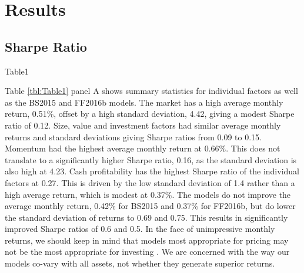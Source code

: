 
\section{Results} \label{sec:results}

\subsection{Sharpe Ratio}

{Table1}

Table \ref{tbl:Table1} panel A shows summary statistics for individual factors as well as the 
BS2015 and FF2016b models.
The market has a high average monthly return, 0.51\%, offset by a high standard deviation, 
4.42, giving a modest Sharpe ratio of 0.12.
Size, value and investment factors had similar average monthly returns and standard deviations 
giving Sharpe ratios from 0.09 to 0.15.
Momentum had the highest average monthly return at 0.66\%.
This does not translate to a significantly higher Sharpe ratio, 0.16, as the standard 
deviation is also high at 4.23.
Cash profitability has the highest Sharpe ratio of the individual factors at 0.27.
This is driven by the low standard deviation of 1.4 rather than a high average return, which 
is modest at 0.37\%.
The models do not improve the average monthly return, 0.42\% for BS2015 and 0.37\% for 
FF2016b, but do lower the standard deviation of returns to 0.69 and 0.75.
This results in significantly improved Sharpe ratios of 0.6 and 0.5.
In the face of unimpressive monthly returns, we should keep in mind that models most 
appropriate for pricing may not be the most appropriate for investing 
\parencite{pastor2000comparing}.
We are concerned with the way our models co-vary with all assets, not whether they 
generate superior returns.

